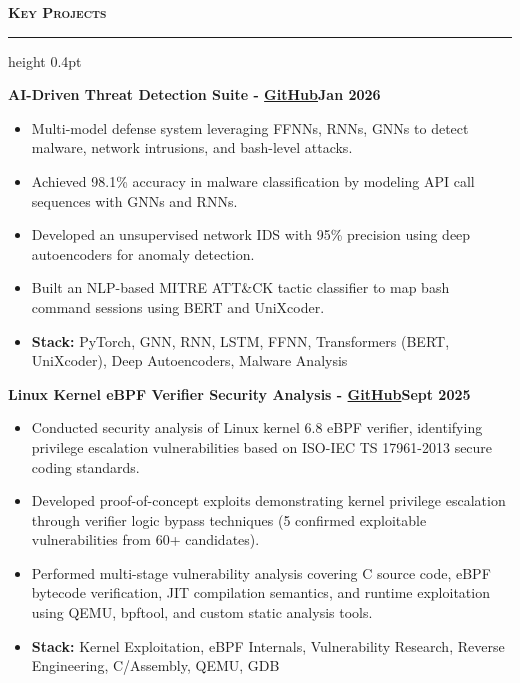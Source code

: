 \documentclass[a4paper,10pt]{article}
\newcommand{\cventry}[2]{\noindent\begin{minipage}[t]{\linewidth}\textbf{#1}\hfill\textbf{#2}\end{minipage}}
\newcommand{\mysection}[1]{%
  \vspace{0.3ex}
  {\large\bfseries\scshape\color{myblue} #1}\enspace%
  \leaders\hrule height 0.4pt\hfill\kern0pt
  \vspace{-0.2em}
}
\begin{document}
\mysection{Key Projects}
\vspace{0.2em}

\cventry{\textbf{AI-Driven Threat Detection Suite} - \href{https://github.com/RenatoMignone/AI-Driven-Threat-Detection-Research}{GitHub}}{Jan 2026}
\begin{itemize}
    \item Multi-model defense system leveraging FFNNs, RNNs, GNNs to detect malware, network intrusions, and bash-level attacks.
    \item Achieved 98.1\% accuracy in malware classification by modeling API call sequences with GNNs and RNNs.
    \item Developed an unsupervised network IDS with 95\% precision using deep autoencoders for anomaly detection.
    \item Built an NLP-based MITRE ATT\&CK tactic classifier to map bash command sessions using BERT and UniXcoder.
    \item \textbf{Stack:} PyTorch, GNN, RNN, LSTM, FFNN, Transformers (BERT, UniXcoder), Deep Autoencoders, Malware Analysis
\end{itemize}

\vspace{0.2em}
\cventry{\textbf{Linux Kernel eBPF Verifier Security Analysis} - \href{https://github.com/RenatoMignone/Linux-eBPF-Verifier-Bypass-Research}{GitHub}}{Sept 2025}
\begin{itemize}
    \item Conducted security analysis of Linux kernel 6.8 eBPF verifier, identifying privilege escalation vulnerabilities based on ISO-IEC TS 17961-2013 secure coding standards.
    \item Developed proof-of-concept exploits demonstrating kernel privilege escalation through verifier logic bypass techniques (5 confirmed exploitable vulnerabilities from 60+ candidates).
    \item Performed multi-stage vulnerability analysis covering C source code, eBPF bytecode verification, JIT compilation semantics, and runtime exploitation using QEMU, bpftool, and custom static analysis tools.
    \item \textbf{Stack:} Kernel Exploitation, eBPF Internals, Vulnerability Research, Reverse Engineering, C/Assembly, QEMU, GDB
\end{itemize}
\end{document}
